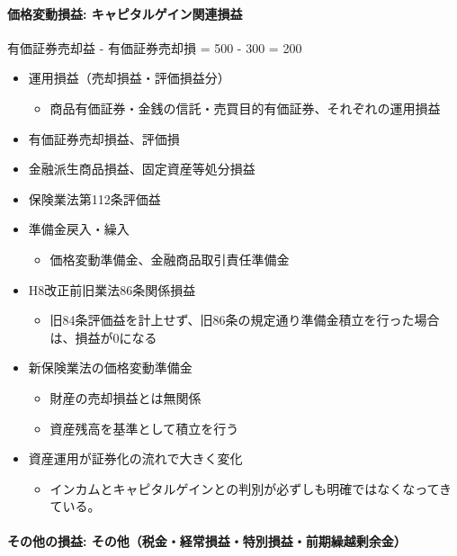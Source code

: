 \documentclass[report,gutter=10mm,fore-edge=10mm,uplatex,dvipdfmx]{jlreq}
\begin{document}
\paragraph{価格変動損益:
キャピタルゲイン関連損益}

有価証券売却益 - 有価証券売却損 = 500 - 300 = 200

\begin{itemize}
\tightlist
\item
  運用損益（売却損益・評価損益分）

  \begin{itemize}
  \tightlist
  \item
    商品有価証券・金銭の信託・売買目的有価証券、それぞれの運用損益
  \end{itemize}
\item
  有価証券売却損益、評価損
\item
  金融派生商品損益、固定資産等処分損益
\item
  保険業法第112条評価益
\item
  準備金戻入・繰入

  \begin{itemize}
  \tightlist
  \item
    価格変動準備金、金融商品取引責任準備金
  \end{itemize}
\item
  H8改正前旧業法86条関係損益

  \begin{itemize}
  \tightlist
  \item
    旧84条評価益を計上せず、旧86条の規定通り準備金積立を行った場合は、損益が0になる
  \end{itemize}
\item
  新保険業法の価格変動準備金

  \begin{itemize}
  \tightlist
  \item
    財産の売却損益とは無関係
  \item
    資産残高を基準として積立を行う
  \end{itemize}
\item
  資産運用が証券化の流れで大きく変化

  \begin{itemize}
  \tightlist
  \item
    インカムとキャピタルゲインとの判別が必ずしも明確ではなくなってきている。
  \end{itemize}
\end{itemize}

\paragraph{その他の損益:
その他（税金・経常損益・特別損益・前期繰越剰余金）}
\end{document}
